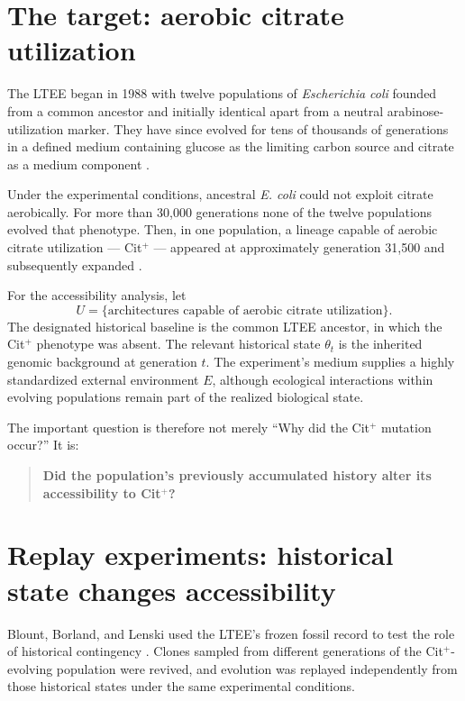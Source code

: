 \documentclass[11pt]{article}
\begin{document}
\section{The target: aerobic citrate utilization}

The LTEE began in 1988 with twelve populations of \emph{Escherichia coli} founded from a common ancestor and initially identical apart from a neutral arabinose-utilization marker. They have since evolved for tens of thousands of generations in a defined medium containing glucose as the limiting carbon source and citrate as a medium component \cite{Blount2008}.

Under the experimental conditions, ancestral \emph{E. coli} could not exploit citrate aerobically. For more than 30,000 generations none of the twelve populations evolved that phenotype. Then, in one population, a lineage capable of aerobic citrate utilization --- Cit$^{+}$ --- appeared at approximately generation 31,500 and subsequently expanded \cite{Blount2008}.

For the accessibility analysis, let
\[
U=\{\text{architectures capable of aerobic citrate utilization}\}.
\]
The designated historical baseline is the common LTEE ancestor, in which the Cit$^{+}$ phenotype was absent. The relevant historical state $\theta_t$ is the inherited genomic background at generation $t$. The experiment's medium supplies a highly standardized external environment $E$, although ecological interactions within evolving populations remain part of the realized biological state.

The important question is therefore not merely ``Why did the Cit$^{+}$ mutation occur?'' It is:

\begin{quote}
\textbf{Did the population's previously accumulated history alter its accessibility to Cit$^{+}$?}
\end{quote}

\section{Replay experiments: historical state changes accessibility}

Blount, Borland, and Lenski used the LTEE's frozen fossil record to test the role of historical contingency \cite{Blount2008}. Clones sampled from different generations of the Cit$^{+}$-evolving population were revived, and evolution was replayed independently from those historical states under the same experimental conditions.
\end{document}
